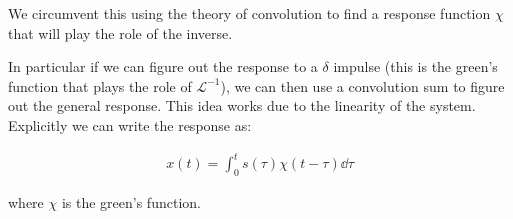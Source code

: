 We circumvent this using the theory of convolution to find a response function $\chi$ that will play the role of the inverse. 

In particular if we can figure out the response to a $\delta$ impulse (this is the green's function that plays the role of $\mathcal{L}^{-1}$), we can then use a convolution sum to figure out the general response. This idea works due to the linearity of the system. Explicitly we can write the response as:

\begin{align*}
x(t) = \int_{0}^{t} s(\tau) \chi (t - \tau) \dd \tau
\end{align*} 


where $\chi$ is the green's function.




